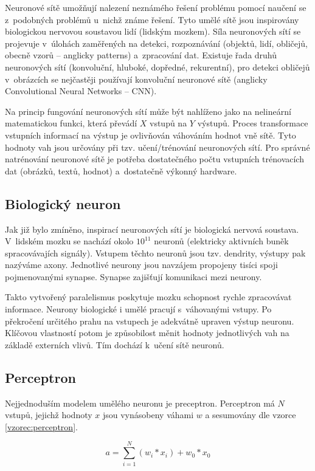 Neuronové sítě \cite{deeplearningbook, ns1994} umožňují nalezení neznámého řešení problému pomocí naučení se z~podobných problémů u~nichž známe řešení. Tyto umělé sítě jsou inspirovány biologickou nervovou soustavou lidí (lidským mozkem). Síla neuronových sítí se projevuje v~úlohách zaměřených na detekci, rozpoznávání (objektů, lidí, obličejů, obecně vzorů -- anglicky patterns) a~zpracování dat. Existuje řada druhů neuronových sítí (konvoluční, hluboké, dopředné, rekurentní), pro detekci obličejů v~obrázcích se nejčastěji používají konvoluční neuronové sítě (anglicky Convolutional Neural Networks -- CNN). 

Na princip fungování neuronových sítí může být nahlíženo jako na nelineární matematickou funkci, která převádí $X$ vstupů na $Y$ výstupů. Proces transformace vstupních informací na výstup je ovlivňován váhováním hodnot vně sítě. Tyto hodnoty vah jsou určovány při tzv. učení/trénování neuronových sítí. Pro správné natrénování neuronové sítě je potřeba dostatečného počtu vstupních trénovacích dat (obrázků, textů, hodnot) a~dostatečně výkonný hardware. 

\subsection*{Biologický neuron}
Jak již bylo zmíněno, inspirací neuronových sítí je biologická nervová soustava. V~lidském mozku se nachází okolo $10^{11}$ neuronů (elektricky aktivních buněk spracovávajích signály). Vstupem těchto neuronů jsou tzv. dendrity, výstupy pak nazýváme axony. Jednotlivé neurony jsou navzájem propojeny tisíci spoji pojmenovanými synapse. Synapse zajišťují komunikaci mezi neurony.

Takto vytvořený paralelismus poskytuje mozku schopnost rychle zpracovávat informace. Neurony biologické i umělé pracují s~váhovanými vstupy. Po překročení určitého prahu na vstupech je adekvátně upraven výstup neuronu. Klíčovou vlastností potom je způsobilost měnit hodnoty jednotlivých vah na základě externích vlivů. Tím dochází k~učení sítě neuronů.

\subsection*{Perceptron}

Nejjednoduším modelem umělého neuronu je preceptron. Perceptron má $N$ vstupů, jejichž hodnoty $x$ jsou vynásobeny váhami $w$ a sesumovány dle vzorce \ref{vzorec:perceptron}.

\begin{equation} \label{vzorec:perceptron}
  a = \sum_{i=1}^{N} (w_i * x_i) + w_0 * x_0
\end{equation}

